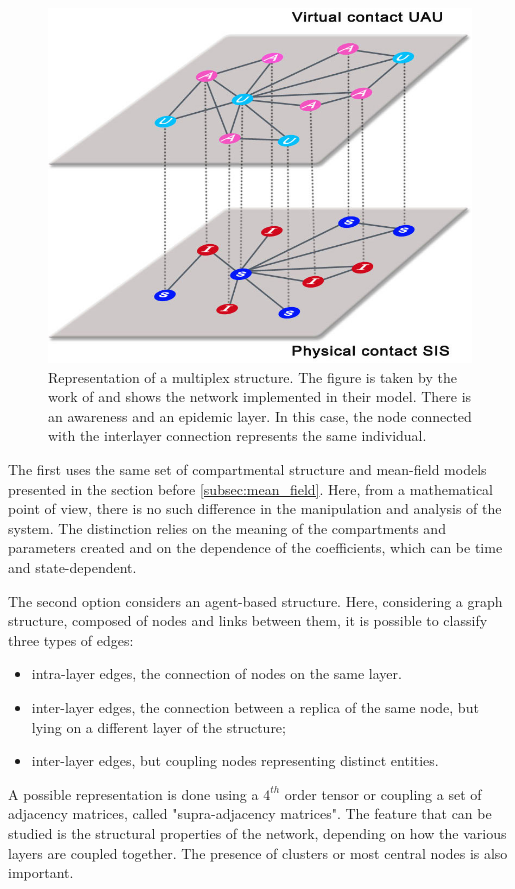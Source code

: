 \begin{figure}[]
	\centering
	\includegraphics[width=0.6\linewidth]{0_introduction/images_introduction/multi_layer}
	\caption[Multi-layer network]{Representation of a multiplex structure. The figure is taken by the work of \cite{Granell2013} and shows the network implemented in their model. There is an awareness and an epidemic layer. In this case, the node connected with the interlayer connection represents the same individual.}
	\label{fig:multilayer}
\end{figure}

The first uses the same set of compartmental structure and mean-field models presented in the section before \ref{subsec:mean_field}. Here, from a mathematical point of view, there is no such difference in the manipulation and analysis of the system. The distinction relies on the meaning of the compartments and parameters created and on the dependence of the coefficients, which can be time and state-dependent.

The second option considers an agent-based structure. Here, considering a graph structure, composed of nodes and links between them, it is possible to classify three types of edges:
\begin{itemize}
	\item intra-layer edges, the connection of nodes on the same layer.
	\item inter-layer edges, the connection between a replica of the same node, but lying on a different layer of the structure;
	\item inter-layer edges, but coupling nodes representing distinct entities. 
\end{itemize}

A possible representation is done using a $4^{th}$ order tensor or coupling a set of adjacency matrices, called "supra-adjacency matrices". The feature that can be studied is the structural properties of the network, depending on how the various layers are coupled together. The presence of clusters or most central nodes is also important.

